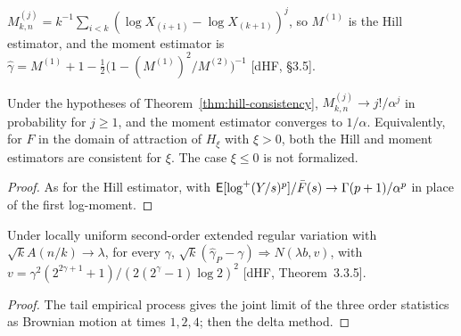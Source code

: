 \begin{definition}
  \label{def:moment-estimator}
  \leanok
  $M^{(j)}_{k,n} = k^{-1} \sum_{i<k} (\log X_{(i+1)} - \log X_{(k+1)})^j$, so $M^{(1)}$ is the
  Hill estimator, and the moment estimator is
  $\hat\gamma = M^{(1)} + 1 - \tfrac12 \big(1 - (M^{(1)})^2/M^{(2)}\big)^{-1}$ [dHF, \S3.5].
\end{definition}

\begin{theorem}
  \label{thm:moment-consistency}
  \leanok
  Under the hypotheses of Theorem~\ref{thm:hill-consistency},
  $M^{(j)}_{k,n} \to j!/\alpha^j$ in probability for $j \ge 1$, and the moment estimator converges
  to $1/\alpha$. Equivalently, for $F$ in the domain of attraction of $H_\xi$ with $\xi > 0$, both
  the Hill and moment estimators are consistent for $\xi$. The case $\xi \le 0$ is not
  formalized.
\end{theorem}
\begin{proof}
  \leanok
  As for the Hill estimator, with $\mathsf{E}[\log^+(Y/s)^p] / \bar F(s) \to \Gamma(p+1)/\alpha^p$ in place
  of the first log-moment.
\end{proof}

\begin{theorem}
  \label{thm:pickands-normality}
  \leanok
  Under locally uniform second-order extended regular variation with $\sqrt{k} A(n/k) \to \lambda$, for every
  $\gamma$, $\sqrt{k}(\hat\gamma_P - \gamma) \Rightarrow N(\lambda b, v)$, with
  $v = \gamma^2 (2^{2\gamma + 1} + 1) / (2 (2^\gamma - 1) \log 2)^2$ [dHF, Theorem~3.3.5].
\end{theorem}
\begin{proof}
  \leanok
  The tail empirical process gives the joint limit of the three order statistics as Brownian motion at times
  $1, 2, 4$; then the delta method.
\end{proof}

